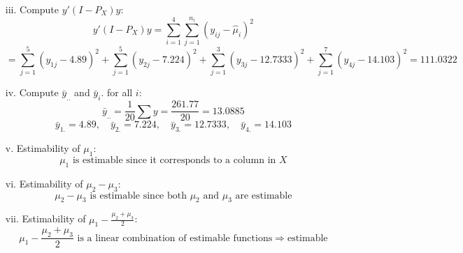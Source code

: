 \documentclass[10pt, oneside]{article}
\begin{document}
\begin{itemize}
\begin{itemize}
		      \item[iii.] Compute $y'(I - P_X)y$:
		            \[
			            y'(I - P_X)y = \sum_{i=1}^{4} \sum_{j=1}^{n_i} (y_{ij} - \hat{\mu}_i)^2
		            \]
		            \[
			            = \sum_{j=1}^{5} (y_{1j} - 4.89)^2 + \sum_{j=1}^{5} (y_{2j} - 7.224)^2 + \sum_{j=1}^{3} (y_{3j} - 12.7333)^2 + \sum_{j=1}^{7} (y_{4j} - 14.103)^2 = 111.0322
		            \]
		      \item[iv.] Compute $\bar{y}_{..}$ and $\bar{y}_i.$ for all $i$:
		            \[
			            \bar{y}_{..} = \frac{1}{20} \sum y = \frac{261.77}{20} = 13.0885
		            \]
		            \[
			            \bar{y}_{1.} = 4.89, \quad \bar{y}_{2.} = 7.224, \quad \bar{y}_{3.} = 12.7333, \quad \bar{y}_{4.} = 14.103
		            \]
		      \item[v.] Estimability of $\mu_1$:
		            \[
			            \mu_1 \text{ is estimable since it corresponds to a column in } X
		            \]
		      \item[vi.] Estimability of $\mu_2 - \mu_3$:
		            \[
			            \mu_2 - \mu_3 \text{ is estimable since both } \mu_2 \text{ and } \mu_3 \text{ are estimable}
		            \]
		      \item[vii.] Estimability of $\mu_1 - \frac{\mu_2 + \mu_3}{2}$:
		            \[
			            \mu_1 - \frac{\mu_2 + \mu_3}{2} \text{ is a linear combination of estimable functions} \Rightarrow \text{estimable}
		            \]
	      \end{itemize}
\end{itemize}
\end{document}

